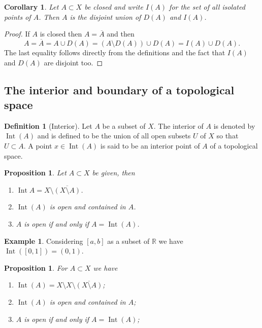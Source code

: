 \documentclass[11pt,a4paper]{article}
\theoremstyle{definition}
\newtheorem{definition}{Definition}[section]
\newtheorem{example}{Example}[section]
\theoremstyle{plain}
\newtheorem{proposition}[theorem]{Proposition}
\newtheorem{corollary}[theorem]{Corollary}
\DeclareMathOperator{\Int}{Int}
\newcommand{\R}{\mathbb{R}}
\begin{document}
  \begin{corollary}
    Let $A \subset X$ be closed and write $I(A)$ for the set of all isolated
    points of $A$. Then $A$ is the disjoint union of $D(A)$ and $I(A)$.
  \end{corollary}
  \begin{proof}
    If $A$ is closed then $A = \overline A$ and then
    \[
      A = \overline A = A \cup D(A) = \left(A \setminus D(A)\right) \cup D(A) =
      I(A) \cup D(A).
    \]
    The last equality follows directly from the definitions and the fact
    that $I(A)$ and $D(A)$ are disjoint too.
  \end{proof}

  \subsection{The interior and boundary of a topological space}

  \begin{definition}[Interior]
    Let $A$ be a subset of $X$. The interior of $A$ is denoted by $\Int(A)$
    and is defined to be the union of all open subsets $U$ of $X$ so that 
    $U \subset A$. A point $x \in \Int(A)$ is said to be an interior point 
    of $A$ of a topological space.
  \end{definition}

  \begin{proposition}
    Let $A \subset X$ be given, then
    \begin{enumerate}
      \item $\Int{A} = X \setminus \overline{(X \setminus A)}$.
      \item $\Int(A)$ is open and contained in $A$.
      \item $A$ is open if and only if $A = \Int(A)$.
    \end{enumerate}
  \end{proposition}

  \begin{example}
    Considering $[a,b]$ as a subset of $\R$ we have $\Int([0,1]) = (0,1)$.
  \end{example}
  
  \begin{proposition}
    For $A \subset X$ we have
    \begin{enumerate}
      \item[(1)] $\Int(A) = X \setminus X \setminus \overline{(X \setminus A)}$;
      \item[(2)] $\Int(A)$ is open and contained in $A$;
      \item[(3)] $A$ is open if and only if $A = \Int(A)$;
    \end{enumerate}
  \end{proposition}
\end{document}
